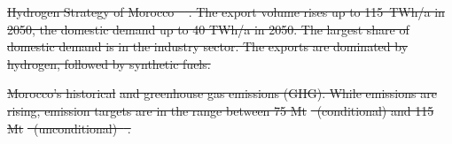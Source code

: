 \documentclass[5p,numafflabel]{elsarticle}
\newcommand{\co}{\ce{CO2}~}
\def\co{CO${}_2${\:}}
\def\coe{CO${}_2$e}
\providecommand{\DIFdeltex}[1]{{\protect\color{red}\sout{#1}}}                      %
\providecommand{\DIFdelbegin}{} %
\providecommand{\DIFdelFL}[1]{\DIFdel{#1}} %
\providecommand{\DIFdel}[1]{\texorpdfstring{\DIFdeltex{#1}}{}} %
\newcommand{\DIFscaledelfig}{0.5}
\newlength{\DIFdelgraphicswidth} %
\newlength{\DIFdelgraphicsheight} %
\newcommand{\DIFdelincludegraphics}[2][]{%
\sbox{\DIFdelgraphicsbox}{\DIFOincludegraphics[#1]{#2}}%
\settoboxwidth{\DIFdelgraphicswidth}{\DIFdelgraphicsbox} %
\settoboxtotalheight{\DIFdelgraphicsheight}{\DIFdelgraphicsbox} %
\scalebox{\DIFscaledelfig}{%
\parbox[b]{\DIFdelgraphicswidth}{\usebox{\DIFdelgraphicsbox}\\[-\baselineskip] \rule{\DIFdelgraphicswidth}{0em}}\llap{\resizebox{\DIFdelgraphicswidth}{\DIFdelgraphicsheight}{%
\setlength{\unitlength}{\DIFdelgraphicswidth}%
\begin{picture}(1,1)%
\thicklines\linethickness{2pt} %
{\color[rgb]{1,0,0}\put(0,0){\framebox(1,1){}}}%
{\color[rgb]{1,0,0}\put(0,0){\line( 1,1){1}}}%
{\color[rgb]{1,0,0}\put(0,1){\line(1,-1){1}}}%
\end{picture}%
}\hspace*{3pt}}} %
} %
\DeclareRobustCommand{\DIFdelbegin}{\DIFOdelbegin \let\includegraphics\DIFdelincludegraphics} %
\begin{document}



\DIFdelbegin %
{%
\DIFdelFL{Hydrogen Strategy of Morocco \mbox{%
\cite{MarHyStrat2021}}\hspace{0pt}%
. The export volume rises up to 115~TWh/a in 2050, the domestic demand up to 40 TWh/a in 2050. The largest share of domestic demand is in the industry sector. The exports are dominated by hydrogen, followed by synthetic fuels.}}

{%
\DIFdelFL{Morocco's historical }%
\DIFdelFL{and greenhouse gas emissions (GHG). While emissions are rising, emission targets are in the range between 75 Mt}%
\DIFdelFL{\ (conditional) and 115 Mt}%
\DIFdelFL{\ (unconditional)\mbox{%
\cite{CAT2021}}\hspace{0pt}%
.}}
\end{document}
